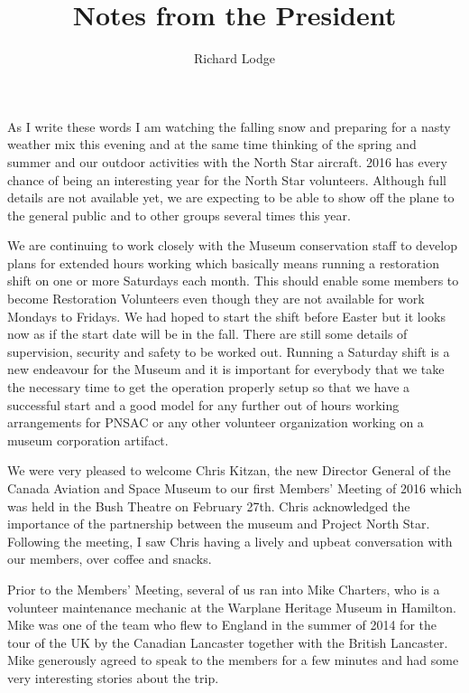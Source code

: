 
%


\title{Notes from the President}
\author{Richard Lodge}

\maketitle

As I write these words I am watching the falling snow and preparing for a nasty weather mix this evening and at the same time thinking of the spring and summer and our outdoor activities with the North Star aircraft. 2016 has every chance of being an interesting year for the North Star volunteers. Although full details are not available yet, we are expecting to be able to show off the plane to the general public and to other groups several times this year. 

We are continuing to work closely with the Museum conservation staff to develop plans for extended hours working which basically means running a restoration shift on one or more Saturdays each month. This should enable some members to become Restoration Volunteers even though they are not available for work Mondays to Fridays. We had hoped to start the shift before Easter but it looks now as if the start date will be in the fall. There are still some details of supervision, security and safety to be worked out. Running a Saturday shift is a new endeavour for the Museum and it is important for everybody that we take the necessary time to get the operation properly setup so that we have a successful start and a good model for any further out of hours working arrangements for PNSAC or any other volunteer organization working on a museum corporation artifact. 

We were very pleased to welcome Chris Kitzan, the new Director General of the Canada Aviation and Space Museum to our first Members' Meeting of 2016 which was held in the Bush Theatre on February 27th. Chris acknowledged the importance of the partnership between the museum and Project North Star. Following the meeting, I saw Chris having a lively and upbeat conversation with our members, over coffee and snacks. 

Prior to the Members' Meeting, several of us ran into Mike Charters, who is a volunteer maintenance mechanic at the Warplane Heritage Museum in Hamilton. Mike was one of the team who flew to England in the summer of 2014 for the tour of the UK by the Canadian Lancaster together with the British Lancaster. Mike generously agreed to speak to the members for a few minutes and had some very interesting stories about the trip.
 
